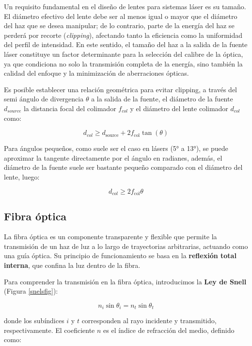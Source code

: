 Un requisito fundamental en el diseño de lentes para sistemas láser es su tamaño. El diámetro efectivo del lente debe ser al menos igual o mayor que el diámetro del haz que se desea manipular; de lo contrario, parte de la energía del haz se perderá por recorte (\textit{clipping}), afectando tanto la eficiencia como la uniformidad del perfil de intensidad. En este sentido, el tamaño del haz a la salida de la fuente láser constituye un factor determinante para la selección del calibre de la óptica, ya que condiciona no solo la transmisión completa de la energía, sino también la calidad del enfoque y la minimización de aberraciones ópticas.

Es posible establecer una relación geométrica para evitar clipping, a través del semi ángulo de divergencia $\theta$ a la salida de la fuente, el diámetro de la fuente $d_{source}$ la distancia focal del colimador $f_{col}$ y el diámetro del lente colimador $d_{col}$ como:

\begin{equation}
	d_{col} \ge d_{\text{source}} + 2 f_{\text{col}} \tan(\theta)
\end{equation}

Para ángulos pequeños, como suele ser el caso en lásers (5° a 13°), se puede aproximar la tangente directamente por el ángulo en radianes, además, el diámetro de la fuente suele ser bastante pequeño comparado con el diámetro del lente, luego:

\begin{equation}
	d_{col} \ge  2 f_{\text{col}}\theta
\end{equation}

\subsection{Fibra óptica}

La fibra óptica es un componente transparente y flexible que permite la transmisión de un haz de luz a lo largo de trayectorias arbitrarias, actuando como una guía óptica. Su principio de funcionamiento se basa en la \textbf{reflexión total interna}, que confina la luz dentro de la fibra.

Para comprender la transmisión en la fibra óptica, introducimos la \textbf{Ley de Snell} (Figura \ref{snelsfig}):

\begin{equation}
	n_i \sin\theta_i = n_t \sin\theta_t 
\end{equation}

donde los subíndices $i$ y $t$ corresponden al rayo incidente y transmitido, respectivamente. El coeficiente $n$ es el índice de refracción del medio, definido como:

